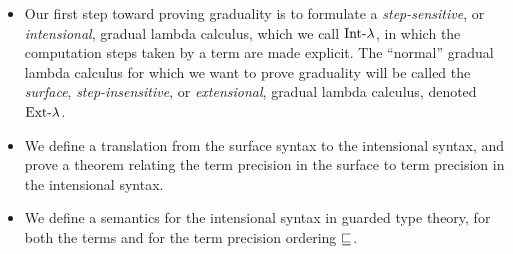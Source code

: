 \begin{itemize}
  \item Our first step toward proving graduality is to formulate a \emph{step-sensitive},
  or \emph{intensional}, gradual lambda calculus, which we call $\text{Int-}\lambda$, in which the
  computation steps taken by a term are made explicit.
  The ``normal'' gradual lambda calculus for which we want to prove graduality will be called the
  \emph{surface}, \emph{step-insensitive}, or \emph{extensional}, gradual lambda calculus,
  denoted $\text{Ext-}\lambda$.

  \item We define a translation from the surface syntax to the intensional syntax, and
  prove a theorem relating the term precision in the surface to term precision in the
  intensional syntax.
  
  \item We define a semantics for the intensional syntax in guarded type theory, for both the
  terms and for the term precision ordering $\sqsubseteq$.

\end{itemize}
